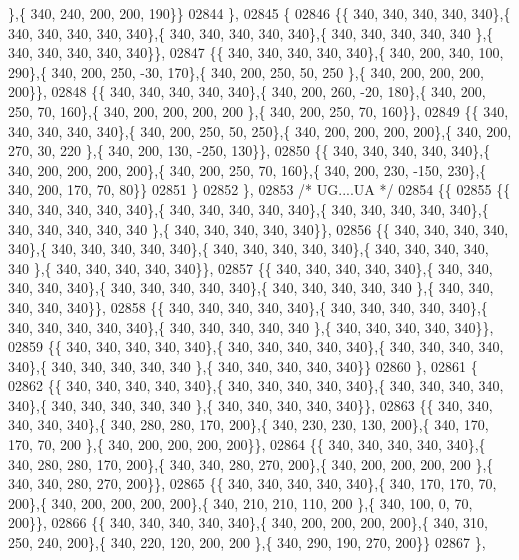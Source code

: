 \begin{DoxyCode}
      \},\{ 340, 240, 200, 200, 190\}\}
02844 \},
02845 \{
02846 \{\{ 340, 340, 340, 340, 340\},\{ 340, 340, 340, 340, 340\},\{ 340, 340, 340, 340, 340\},\{ 340, 340, 340, 340, 340
      \},\{ 340, 340, 340, 340, 340\}\},
02847 \{\{ 340, 340, 340, 340, 340\},\{ 340, 200, 340, 100, 290\},\{ 340, 200, 250, -30, 170\},\{ 340, 200, 250,  50, 250
      \},\{ 340, 200, 200, 200, 200\}\},
02848 \{\{ 340, 340, 340, 340, 340\},\{ 340, 200, 260, -20, 180\},\{ 340, 200, 250,  70, 160\},\{ 340, 200, 200, 200, 200
      \},\{ 340, 200, 250,  70, 160\}\},
02849 \{\{ 340, 340, 340, 340, 340\},\{ 340, 200, 250,  50, 250\},\{ 340, 200, 200, 200, 200\},\{ 340, 200, 270,  30, 220
      \},\{ 340, 200, 130, -250, 130\}\},
02850 \{\{ 340, 340, 340, 340, 340\},\{ 340, 200, 200, 200, 200\},\{ 340, 200, 250,  70, 160\},\{ 340, 200, 230, -150, 
      230\},\{ 340, 200, 170,  70,  80\}\}
02851 \}
02852 \},
02853 \textcolor{comment}{/* UG....UA */}
02854 \{\{
02855 \{\{ 340, 340, 340, 340, 340\},\{ 340, 340, 340, 340, 340\},\{ 340, 340, 340, 340, 340\},\{ 340, 340, 340, 340, 340
      \},\{ 340, 340, 340, 340, 340\}\},
02856 \{\{ 340, 340, 340, 340, 340\},\{ 340, 340, 340, 340, 340\},\{ 340, 340, 340, 340, 340\},\{ 340, 340, 340, 340, 340
      \},\{ 340, 340, 340, 340, 340\}\},
02857 \{\{ 340, 340, 340, 340, 340\},\{ 340, 340, 340, 340, 340\},\{ 340, 340, 340, 340, 340\},\{ 340, 340, 340, 340, 340
      \},\{ 340, 340, 340, 340, 340\}\},
02858 \{\{ 340, 340, 340, 340, 340\},\{ 340, 340, 340, 340, 340\},\{ 340, 340, 340, 340, 340\},\{ 340, 340, 340, 340, 340
      \},\{ 340, 340, 340, 340, 340\}\},
02859 \{\{ 340, 340, 340, 340, 340\},\{ 340, 340, 340, 340, 340\},\{ 340, 340, 340, 340, 340\},\{ 340, 340, 340, 340, 340
      \},\{ 340, 340, 340, 340, 340\}\}
02860 \},
02861 \{
02862 \{\{ 340, 340, 340, 340, 340\},\{ 340, 340, 340, 340, 340\},\{ 340, 340, 340, 340, 340\},\{ 340, 340, 340, 340, 340
      \},\{ 340, 340, 340, 340, 340\}\},
02863 \{\{ 340, 340, 340, 340, 340\},\{ 340, 280, 280, 170, 200\},\{ 340, 230, 230, 130, 200\},\{ 340, 170, 170,  70, 200
      \},\{ 340, 200, 200, 200, 200\}\},
02864 \{\{ 340, 340, 340, 340, 340\},\{ 340, 280, 280, 170, 200\},\{ 340, 340, 280, 270, 200\},\{ 340, 200, 200, 200, 200
      \},\{ 340, 340, 280, 270, 200\}\},
02865 \{\{ 340, 340, 340, 340, 340\},\{ 340, 170, 170,  70, 200\},\{ 340, 200, 200, 200, 200\},\{ 340, 210, 210, 110, 200
      \},\{ 340, 100,   0,  70, 200\}\},
02866 \{\{ 340, 340, 340, 340, 340\},\{ 340, 200, 200, 200, 200\},\{ 340, 310, 250, 240, 200\},\{ 340, 220, 120, 200, 200
      \},\{ 340, 290, 190, 270, 200\}\}
02867 \},

\end{DoxyCode}
